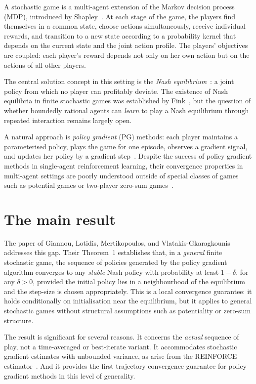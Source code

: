 \documentclass[a4paper,oneside,11pt]{report}
\numberwithin{theorem}{chapter}
\numberwithin{equation}{chapter}
\begin{document}
A stochastic game is a multi-agent extension of the Markov decision
process (MDP), introduced by Shapley~\cite{shapley1953}. At each stage
of the game, the players find themselves in a common state, choose
actions simultaneously, receive individual rewards, and transition to a
new state according to a probability kernel that depends on the current
state and the joint action profile. The players' objectives are coupled:
each player's reward depends not only on her own action but on the
actions of all other players.

The central solution concept in this setting is the \emph{Nash
  equilibrium}~\cite{nash1951}: a joint policy from which no player can
profitably deviate. The existence of Nash equilibria in finite stochastic
games was established by Fink~\cite{fink1964}, but the question of
whether boundedly rational agents can \emph{learn} to play a Nash
equilibrium through repeated interaction remains largely open.

A natural approach is \emph{policy gradient} (PG) methods: each player
maintains a parameterised policy, plays the game for one episode,
observes a gradient signal, and updates her policy by a gradient
step~\cite{sutton2018,agarwal2021}. Despite the success of policy
gradient methods in single-agent reinforcement learning, their
convergence properties in multi-agent settings are poorly understood
outside of special classes of games such as potential games or two-player
zero-sum games~\cite{leonardos2022,zhang2022,daskalakis2022}.

\section{The main result}

The paper of Giannou, Lotidis, Mertikopoulos, and
Vlatakis-Gkaragkounis~\cite{giannou2022} addresses this gap. Their
Theorem~1 establishes that, in a \emph{general} finite stochastic game,
the sequence of policies generated by the policy gradient algorithm
converges to any \emph{stable} Nash policy with probability at least
$1-\delta$, for any $\delta > 0$, provided the initial policy lies in a
neighbourhood of the equilibrium and the step-size is chosen
appropriately. This is a local convergence guarantee: it holds
conditionally on initialisation near the equilibrium, but it applies to
general stochastic games without structural assumptions such as
potentiality or zero-sum structure.

The result is significant for several reasons. It concerns the
\emph{actual} sequence of play, not a time-averaged or best-iterate
variant. It accommodates stochastic gradient estimates with unbounded
variance, as arise from the REINFORCE estimator~\cite{williams1992}. And
it provides the first trajectory convergence guarantee for policy
gradient methods in this level of generality.
\end{document}
